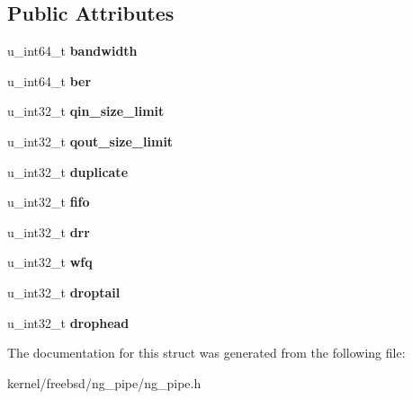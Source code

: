 \subsection*{Public Attributes}
\begin{DoxyCompactItemize}
\item 
\hypertarget{structng__pipe__hookcfg_a016101f07ea0c7f643003cb6f6f387ca}{u\+\_\+int64\+\_\+t {\bfseries bandwidth}}\label{structng__pipe__hookcfg_a016101f07ea0c7f643003cb6f6f387ca}

\item 
\hypertarget{structng__pipe__hookcfg_a7768320c47f09528f9ca2d86db7f2f17}{u\+\_\+int64\+\_\+t {\bfseries ber}}\label{structng__pipe__hookcfg_a7768320c47f09528f9ca2d86db7f2f17}

\item 
\hypertarget{structng__pipe__hookcfg_ac3b7da114215f4c299317f575ce0670c}{u\+\_\+int32\+\_\+t {\bfseries qin\+\_\+size\+\_\+limit}}\label{structng__pipe__hookcfg_ac3b7da114215f4c299317f575ce0670c}

\item 
\hypertarget{structng__pipe__hookcfg_ae5fbb31ec3a6d24a677ca2db97c582a7}{u\+\_\+int32\+\_\+t {\bfseries qout\+\_\+size\+\_\+limit}}\label{structng__pipe__hookcfg_ae5fbb31ec3a6d24a677ca2db97c582a7}

\item 
\hypertarget{structng__pipe__hookcfg_a8e075b9ee5a4f5f28eafcb2834bd5f3c}{u\+\_\+int32\+\_\+t {\bfseries duplicate}}\label{structng__pipe__hookcfg_a8e075b9ee5a4f5f28eafcb2834bd5f3c}

\item 
\hypertarget{structng__pipe__hookcfg_a749eba818e7fad921ec576c6ff4dca71}{u\+\_\+int32\+\_\+t {\bfseries fifo}}\label{structng__pipe__hookcfg_a749eba818e7fad921ec576c6ff4dca71}

\item 
\hypertarget{structng__pipe__hookcfg_a45725ac77713eb6781081b7872edac35}{u\+\_\+int32\+\_\+t {\bfseries drr}}\label{structng__pipe__hookcfg_a45725ac77713eb6781081b7872edac35}

\item 
\hypertarget{structng__pipe__hookcfg_a488dc2a8eb8d28e54d343e2afcca1bdb}{u\+\_\+int32\+\_\+t {\bfseries wfq}}\label{structng__pipe__hookcfg_a488dc2a8eb8d28e54d343e2afcca1bdb}

\item 
\hypertarget{structng__pipe__hookcfg_a15d42959a70b0f561db56462ce1e801b}{u\+\_\+int32\+\_\+t {\bfseries droptail}}\label{structng__pipe__hookcfg_a15d42959a70b0f561db56462ce1e801b}

\item 
\hypertarget{structng__pipe__hookcfg_ab0d916d3ba92277e56be04032799fe29}{u\+\_\+int32\+\_\+t {\bfseries drophead}}\label{structng__pipe__hookcfg_ab0d916d3ba92277e56be04032799fe29}

\end{DoxyCompactItemize}


The documentation for this struct was generated from the following file\+:\begin{DoxyCompactItemize}
\item 
kernel/freebsd/ng\+\_\+pipe/ng\+\_\+pipe.\+h\end{DoxyCompactItemize}
